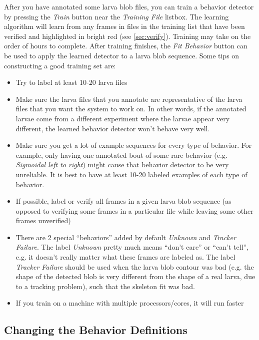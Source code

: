 \documentclass[10pt, onecolumn]{article}
\newcommand{\1}{\textbf{1}}
\begin{document}
After you have annotated some larva blob files, you can train a behavior detector by pressing the \textit{Train} button near the \textit{Training File} listbox.  The learning algorithm will learn from any frames in files in the training list that have been verified and highlighted in bright red (see \ref{sec:verify}).  Training may take on the order of hours to complete.  After training finishes, the \textit{Fit Behavior} button can be used to apply the learned detector to a larva blob sequence. Some tips on constructing a good training set are:
\begin{itemize}
 \item Try to label at least 10-20 larva files
 \item Make sure the larva files that you annotate are representative of the larva files that you want the system to work on.  In other words, if the annotated larvae come from a different experiment where the larvae appear very different, the learned behavior detector won't behave very well.
 \item Make sure you get a lot of example sequences for every type of behavior.  For example, only having one annotated bout of some rare behavior (e.g. \textit{Sigmoidal left to right}) might cause that behavior detector to be very unreliable.  It is best to have at least 10-20 labeled examples of each type of behavior.
 \item If possible, label or verify all frames in a given larva blob sequence (as opposed to verifying some frames in a particular file while leaving some other frames unverified)
 \item There are 2 special ``behaviors'' added by default \textit{Unknown} and \textit{Tracker Failure}.  The label \textit{Unknown} pretty much means ``don't care'' or ``can't tell'', e.g. it doesn't really matter what these frames are labeled as.  The label \textit{Tracker Failure} should be used when the larva blob contour was bad (e.g. the shape of the detected blob is very different from the shape of a real larva, due to a tracking problem), such that the skeleton fit was bad.
 \item If you train on a machine with multiple processors/cores, it will run faster
\end{itemize}


\subsection{Changing the Behavior Definitions}
\end{document}
